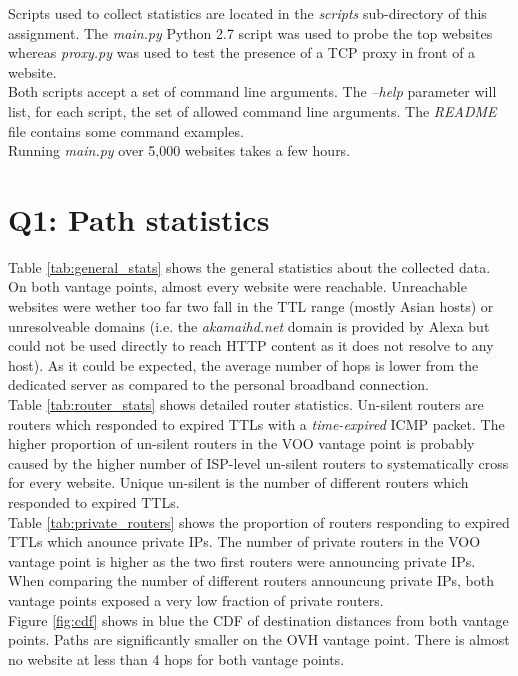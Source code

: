 \documentclass[journal]{IEEEtran}
\begin{document}
Scripts used to collect statistics are located in the \textit{scripts} sub-directory of this assignment. The \textit{main.py} Python 2.7 script was used to probe the top websites whereas \textit{proxy.py} was used to test the presence of a TCP proxy in front of a website. \\
Both scripts accept a set of command line arguments. The \textit{--help} parameter will list, for each script, the set of allowed command line arguments. The \textit{README} file contains some command examples. \\
Running \textit{main.py} over 5,000 websites takes a few hours.

\section{Q1: Path statistics}

Table \ref{tab:general_stats} shows the general statistics about the collected data. On both vantage points, almost every website were reachable. Unreachable websites were wether too far two fall in the TTL range (mostly Asian hosts) or unresolveable domains (i.e. the \textit{akamaihd.net} domain is provided by Alexa but could not be used directly to reach HTTP content as it does not resolve to any host). As it could be expected, the average number of hops is lower from the dedicated server as compared to the personal broadband connection. \\
Table \ref{tab:router_stats} shows detailed router statistics. Un-silent routers are routers which responded to expired TTLs with a \textit{time-expired} ICMP packet. The higher proportion of un-silent routers in the VOO vantage point is probably caused by the higher number of ISP-level un-silent routers to systematically cross for every website. Unique un-silent is the number of different routers which responded to expired TTLs. \\
Table \ref{tab:private_routers} shows the proportion of routers responding to expired TTLs which anounce private IPs. The number of private routers in the VOO vantage point is higher as the two first routers were announcing private IPs. When comparing the number of different routers announcung private IPs, both vantage points exposed a very low fraction of private routers. \\
Figure \ref{fig:cdf} shows in blue the CDF of destination distances from both vantage points. Paths are significantly smaller on the OVH vantage point. There is almost no website at less than 4 hops for both vantage points.
\end{document}
